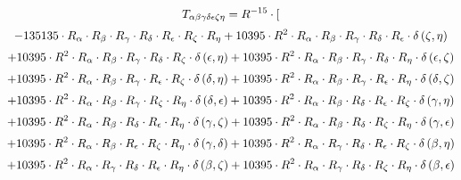 \begin{subequations}\begin{gather}
T_{\alpha{}\beta{}\gamma{}\delta{}\epsilon{}\zeta{}\eta{}} = R^{-15} \cdot [ 
 \\[0.2em] \notag - 135135 \cdot R_{\alpha{}} \cdot R_{\beta{}} \cdot R_{\gamma{}} \cdot R_{\delta{}} \cdot R_{\epsilon{}} \cdot R_{\zeta{}} \cdot R_{\eta{}}+ 10395 \cdot R^{2} \cdot R_{\alpha{}} \cdot R_{\beta{}} \cdot R_{\gamma{}} \cdot R_{\delta{}} \cdot R_{\epsilon{}} \cdot \delta{}\left(\zeta{}, \eta{}\right) 
 \\[0.2em] \notag 		 + 10395 \cdot R^{2} \cdot R_{\alpha{}} \cdot R_{\beta{}} \cdot R_{\gamma{}} \cdot R_{\delta{}} \cdot R_{\zeta{}} \cdot \delta{}\left(\epsilon{}, \eta{}\right)+ 10395 \cdot R^{2} \cdot R_{\alpha{}} \cdot R_{\beta{}} \cdot R_{\gamma{}} \cdot R_{\delta{}} \cdot R_{\eta{}} \cdot \delta{}\left(\epsilon{}, \zeta{}\right) 
 \\[0.2em] \notag 		 + 10395 \cdot R^{2} \cdot R_{\alpha{}} \cdot R_{\beta{}} \cdot R_{\gamma{}} \cdot R_{\epsilon{}} \cdot R_{\zeta{}} \cdot \delta{}\left(\delta{}, \eta{}\right)+ 10395 \cdot R^{2} \cdot R_{\alpha{}} \cdot R_{\beta{}} \cdot R_{\gamma{}} \cdot R_{\epsilon{}} \cdot R_{\eta{}} \cdot \delta{}\left(\delta{}, \zeta{}\right) 
 \\[0.2em] \notag 		 + 10395 \cdot R^{2} \cdot R_{\alpha{}} \cdot R_{\beta{}} \cdot R_{\gamma{}} \cdot R_{\zeta{}} \cdot R_{\eta{}} \cdot \delta{}\left(\delta{}, \epsilon{}\right)+ 10395 \cdot R^{2} \cdot R_{\alpha{}} \cdot R_{\beta{}} \cdot R_{\delta{}} \cdot R_{\epsilon{}} \cdot R_{\zeta{}} \cdot \delta{}\left(\gamma{}, \eta{}\right) 
 \\[0.2em] \notag 		 + 10395 \cdot R^{2} \cdot R_{\alpha{}} \cdot R_{\beta{}} \cdot R_{\delta{}} \cdot R_{\epsilon{}} \cdot R_{\eta{}} \cdot \delta{}\left(\gamma{}, \zeta{}\right)+ 10395 \cdot R^{2} \cdot R_{\alpha{}} \cdot R_{\beta{}} \cdot R_{\delta{}} \cdot R_{\zeta{}} \cdot R_{\eta{}} \cdot \delta{}\left(\gamma{}, \epsilon{}\right) 
 \\[0.2em] \notag 		 + 10395 \cdot R^{2} \cdot R_{\alpha{}} \cdot R_{\beta{}} \cdot R_{\epsilon{}} \cdot R_{\zeta{}} \cdot R_{\eta{}} \cdot \delta{}\left(\gamma{}, \delta{}\right)+ 10395 \cdot R^{2} \cdot R_{\alpha{}} \cdot R_{\gamma{}} \cdot R_{\delta{}} \cdot R_{\epsilon{}} \cdot R_{\zeta{}} \cdot \delta{}\left(\beta{}, \eta{}\right) 
 \\[0.2em] \notag 		 + 10395 \cdot R^{2} \cdot R_{\alpha{}} \cdot R_{\gamma{}} \cdot R_{\delta{}} \cdot R_{\epsilon{}} \cdot R_{\eta{}} \cdot \delta{}\left(\beta{}, \zeta{}\right)+ 10395 \cdot R^{2} \cdot R_{\alpha{}} \cdot R_{\gamma{}} \cdot R_{\delta{}} \cdot R_{\zeta{}} \cdot R_{\eta{}} \cdot \delta{}\left(\beta{}, \epsilon{}\right) 

\end{gather}
\end{subequations}
